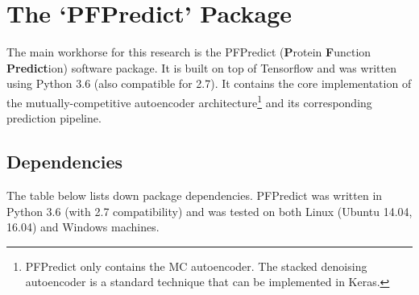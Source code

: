 %
%
%
%
%

\chapter{The `PFPredict' Package}
\label{AppendixPFPredict}

\par The main workhorse for this research is the PFPredict (\textbf{P}rotein
\textbf{F}unction \textbf{Predict}ion) software package. It is built on top of
Tensorflow and was written using Python 3.6 (also compatible for 2.7). It
contains the core implementation of the mutually-competitive autoencoder
architecture\footnote{
    PFPredict only contains the MC autoencoder. The stacked denoising
    autoencoder is a standard technique that can be implemented in
    Keras.
} and its corresponding prediction pipeline.

\section{Dependencies}

\par The table below lists down package dependencies. PFPredict was written in
Python 3.6 (with 2.7 compatibility) and was tested on both Linux (Ubuntu
14.04, 16.04) and Windows machines.

